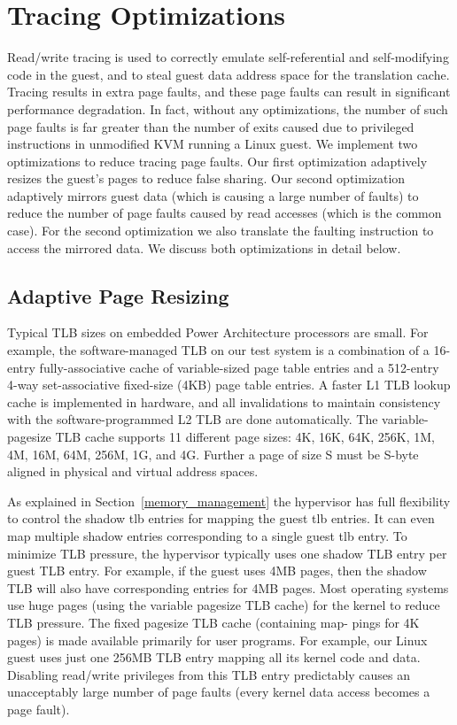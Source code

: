 \chapter{Tracing Optimizations}\label{ch:5}
Read/write tracing is used to correctly emulate self-referential and self-modifying code in the guest, and to steal guest data address space for the translation cache. Tracing results in extra page faults, and these page faults can result in significant performance degradation. In fact, without any optimizations, the number of such page faults is far greater than the number of exits caused due to privileged instructions in unmodified KVM running a Linux guest.
We implement two optimizations to reduce tracing page faults. Our first optimization adaptively resizes the guest’s pages to reduce false sharing. Our second optimization adaptively mirrors guest data (which is causing a large number of faults) to reduce the number of page faults caused by read accesses (which is the common case). For the second optimization we also translate the faulting instruction to access the mirrored data. We discuss both optimizations in detail below.

\section{Adaptive Page Resizing}
Typical TLB sizes on embedded Power Architecture processors are small. For example, the software-managed TLB on our test system is a combination of a 16-entry fully-associative cache of variable-sized page table entries and a 512-entry 4-way set-associative fixed-size (4KB) page table entries. A faster L1 TLB lookup cache is implemented in hardware, and all invalidations to maintain consistency with the software-programmed L2 TLB are done automatically. The variable-pagesize TLB cache supports 11 different page sizes: 4K, 16K, 64K, 256K, 1M, 4M, 16M, 64M, 256M, 1G, and 4G. Further a page of size S must be S-byte aligned in physical and virtual address spaces.

As explained in Section~\ref{memory_management} the hypervisor has full flexibility to control the shadow tlb entries for mapping the guest tlb entries. It can even map multiple shadow entries corresponding to a single guest tlb entry. To minimize TLB pressure, the hypervisor typically uses one shadow TLB entry per guest TLB entry. For example, if the guest uses 4MB pages, then the shadow TLB will also have corresponding entries for 4MB pages. Most operating systems use huge pages (using the variable pagesize TLB cache) for the kernel to reduce TLB pressure. The fixed pagesize TLB cache (containing map- pings for 4K pages) is made available primarily for user programs. For example, our Linux guest uses just one 256MB TLB entry mapping all its kernel code and data. Disabling read/write privileges from this TLB entry predictably causes an unacceptably large number of page faults (every kernel data access becomes a page fault).

